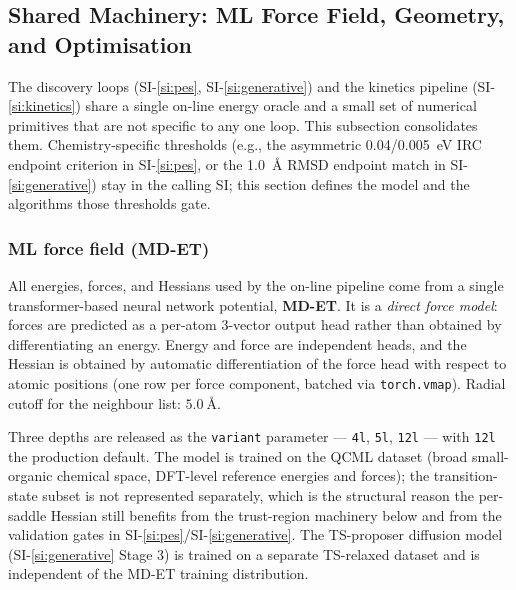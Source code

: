 %

\subsection{Shared Machinery: ML Force Field, Geometry, and Optimisation}
\label{si:shared}

The discovery loops (SI-\ref{si:pes}, SI-\ref{si:generative}) and the kinetics pipeline (SI-\ref{si:kinetics}) share a single on-line energy oracle and a small set of numerical primitives that are not specific to any one loop. This subsection consolidates them. Chemistry-specific thresholds (e.g., the asymmetric \SI{0.04}{}/\SI{0.005}{eV} IRC endpoint criterion in SI-\ref{si:pes}, or the \SI{1.0}{\angstrom} RMSD endpoint match in SI-\ref{si:generative}) stay in the calling SI; this section defines the model and the algorithms those thresholds gate.

\subsubsection{ML force field (MD-ET)}
\label{sec:shared-mdet}

All energies, forces, and Hessians used by the on-line pipeline come from a single transformer-based neural network potential, \textbf{MD-ET}. It is a \emph{direct force model}: forces are predicted as a per-atom 3-vector output head rather than obtained by differentiating an energy. Energy and force are independent heads, and the Hessian is obtained by automatic differentiation of the force head with respect to atomic positions (one row per force component, batched via \texttt{torch.vmap}). Radial cutoff for the neighbour list: $\SI{5.0}{\angstrom}$.

Three depths are released as the \texttt{variant} parameter --- \texttt{4l}, \texttt{5l}, \texttt{12l} --- with \texttt{12l} the production default. The model is trained on the QCML dataset (broad small-organic chemical space, DFT-level reference energies and forces); the transition-state subset is not represented separately, which is the structural reason the per-saddle Hessian still benefits from the trust-region machinery below and from the validation gates in SI-\ref{si:pes}/SI-\ref{si:generative}. The TS-proposer diffusion model (SI-\ref{si:generative} Stage 3) is trained on a separate TS-relaxed dataset and is independent of the MD-ET training distribution.

